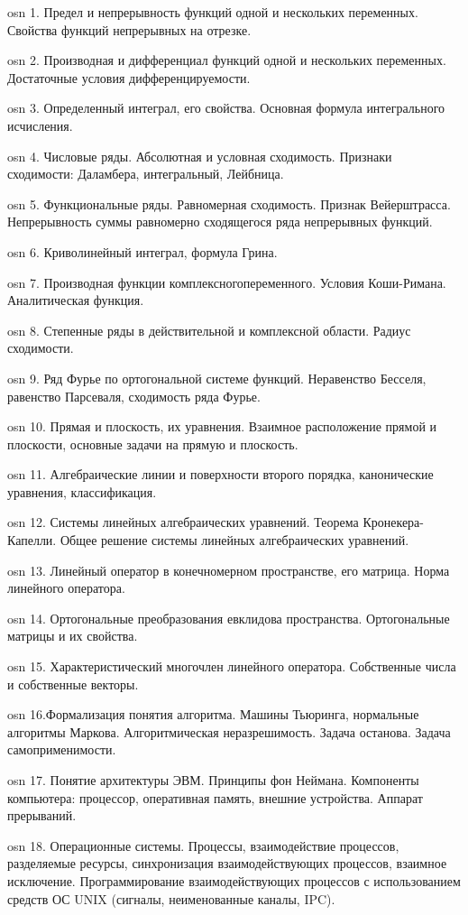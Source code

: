 osn 1. Предел и непрерывность функций одной и нескольких переменных. Свойства функций  непрерывных на отрезке.

osn 2. Производная и дифференциал функций одной и нескольких переменных. Достаточные условия дифференцируемости.

osn 3. Определенный интеграл, его свойства. Основная формула интегрального исчисления.

osn 4. Числовые ряды. Абсолютная и условная сходимость. Признаки сходимости: Даламбера, интегральный, Лейбница.

osn 5. Функциональные ряды. Равномерная сходимость. Признак Вейерштрасса. Непрерывность суммы  равномерно сходящегося ряда непрерывных функций.

osn 6. Криволинейный интеграл, формула Грина.

osn 7. Производная функции комплексногопеременного. Условия Коши-Римана. Аналитическая  функция.

osn 8. Степенные ряды в действительной и комплексной области. Радиус сходимости.

osn 9. Ряд Фурье по ортогональной системе функций. Неравенство Бесселя, равенство Парсеваля,  сходимость ряда Фурье.

osn 10. Прямая и плоскость, их уравнения. Взаимное расположение прямой и плоскости,  основные задачи на прямую и плоскость.

osn 11. Алгебраические линии и поверхности второго порядка, канонические уравнения,  классификация.

osn 12. Системы линейных алгебраических уравнений. Теорема Кронекера-Капелли. Общее решение системы линейных алгебраических уравнений.

osn 13. Линейный оператор в конечномерном пространстве, его матрица. Норма линейного оператора.

osn 14. Ортогональные преобразования евклидова пространства. Ортогональные матрицы и их свойства.

osn 15. Характеристический многочлен линейного оператора. Собственные числа и собственные векторы.

osn 16.Формализация понятия алгоритма. Машины Тьюринга, нормальные алгоритмы Маркова. Алгоритмическая неразрешимость. Задача останова. Задача самоприменимости.

osn 17. Понятие архитектуры ЭВМ. Принципы фон Неймана. Компоненты компьютера: процессор, оперативная память, внешние устройства. Аппарат прерываний.

osn 18. Операционные системы. Процессы, взаимодействие процессов, разделяемые ресурсы, синхронизация взаимодействующих процессов, взаимное исключение. Программирование взаимодействующих процессов с использованием средств ОС UNIX (сигналы, неименованные каналы, IPC).

